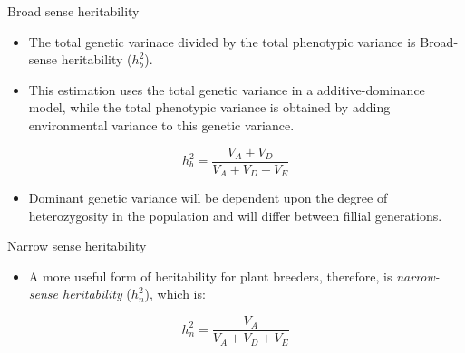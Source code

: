\documentclass[11pt,dvipsnames,ignorenonframetext,aspectratio=169]{beamer}
\providecommand{\tightlist}{%
  \setlength{\itemsep}{0pt}\setlength{\parskip}{0pt}}
\begin{document}
\begin{frame}{Broad sense heritability}
\protect\hypertarget{broad-sense-heritability}{}

\begin{itemize}
\tightlist
\item
  The total genetic varinace divided by the total phenotypic variance is
  Broad-sense heritability (\(h_b^2\)).
\item
  This estimation uses the total genetic variance in a
  additive-dominance model, while the total phenotypic variance is
  obtained by adding environmental variance to this genetic variance.
\end{itemize}

\[
h_b^2 = \frac{V_A + V_D}{V_A + V_D + V_E}
\tag{i}
\]

\begin{itemize}
\tightlist
\item
  Dominant genetic variance will be dependent upon the degree of
  heterozygosity in the population and will differ between fillial
  generations.
\end{itemize}

\end{frame}

\begin{frame}{Narrow sense heritability}
\protect\hypertarget{narrow-sense-heritability}{}

\begin{itemize}
\tightlist
\item
  A more useful form of heritability for plant breeders, therefore, is
  \emph{narrow-sense heritability} (\(h_n^2\)), which is:
\end{itemize}

\[
h_n^2 = \frac{V_A}{V_A+V_D+V_E}
\tag{ii}
\]

\end{frame}
\end{document}
